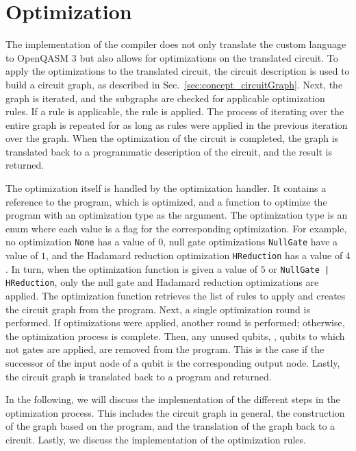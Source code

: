\section{Optimization}
The implementation of the compiler does not only translate the custom language to OpenQASM 3 but also allows for optimizations on the translated circuit. 
To apply the optimizations to the translated circuit, the circuit description is used to build a circuit graph, as described in Sec.~\ref{sec:concept_circuitGraph}. Next, the graph is iterated, and the subgraphs are checked for applicable optimization rules. If a rule is applicable, the rule is applied. The process of iterating over the entire graph is repeated for as long as rules were applied in the previous iteration over the graph. When the optimization of the circuit is completed, the graph is translated back to a programmatic description of the circuit, and the result is returned.

The optimization itself is handled by the optimization handler. It contains a reference to the program, which is optimized, and a function to optimize the program with an optimization type as the argument. The optimization type is an enum where each value is a flag for the corresponding optimization. For example, no optimization \texttt{None} has a value of $0$, null gate optimizations \texttt{NullGate} have a value of $1$, and the Hadamard reduction optimization \texttt{HReduction} has a value of $4$. In turn, when the optimization function is given a value of $5$ or \texttt{NullGate | HReduction}, only the null gate and Hadamard reduction optimizations are applied. The optimization function retrieves the list of rules to apply and creates the circuit graph from the program. Next, a single optimization round is performed. If optimizations were applied, another round is performed; otherwise, the optimization process is complete. Then, any unused qubits, \ie, qubits to which not gates are applied, are removed from the program. This is the case if the successor of the input node of a qubit is the corresponding output node. Lastly, the circuit graph is translated back to a program and returned.

In the following, we will discuss the implementation of the different steps in the optimization process. This includes the circuit graph in general, the construction of the graph based on the program, and the translation of the graph back to a circuit. Lastly, we discuss the implementation of the optimization rules.

